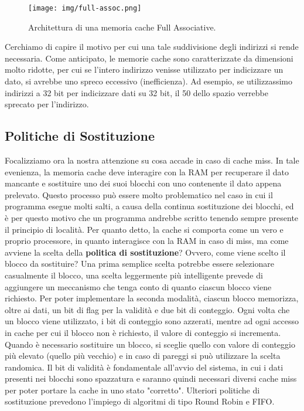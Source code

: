 \begin{figure}[!h]
    \centering
    \texttt{[image: img/full-assoc.png]}
    \caption{Architettura di una memoria cache Full Associative.}
    \label{fig:full-ass}
\end{figure}

Cerchiamo di capire il motivo per cui una tale suddivisione degli indirizzi si rende necessaria. Come anticipato, le memorie cache sono caratterizzate da dimensioni molto ridotte, per cui se l'intero indirizzo venisse utilizzato per indicizzare un dato, si avrebbe uno spreco eccessivo (inefficienza). Ad esempio, se utilizzassimo indirizzi a 32 bit per indicizzare dati su 32 bit, il 50 dello spazio verrebbe sprecato per l'indirizzo.

\subsection{Politiche di Sostituzione}
Focalizziamo ora la nostra attenzione su cosa accade in caso di cache miss. In tale evenienza, la memoria cache deve interagire con la RAM per recuperare il dato mancante e sostituire uno dei suoi blocchi con uno contenente il dato appena prelevato. Questo processo può essere molto problematico nel caso in cui il programma esegue molti salti, a causa della continua sostituzione dei blocchi, ed è per questo motivo che un programma andrebbe scritto tenendo sempre presente il principio di località. Per quanto detto, la cache si comporta come un vero e proprio processore, in quanto interagisce con la RAM in caso di miss, ma come avviene la scelta della \textbf{politica di sostituzione}? Ovvero, come viene scelto il blocco da sostituire? Una prima semplice scelta potrebbe essere selezionare casualmente il blocco, una scelta leggermente più intelligente prevede di aggiungere un meccanismo che tenga conto di quanto ciascun blocco viene richiesto. Per poter implementare la seconda modalità, ciascun blocco memorizza, oltre ai dati, un bit di flag per la validità e due bit di conteggio. Ogni volta che un blocco viene utilizzato, i bit di conteggio sono azzerati, mentre ad ogni accesso in cache per cui il blocco non è richiesto, il valore di conteggio si incrementa. Quando è necessario sostituire un blocco, si sceglie quello con valore di conteggio più elevato (quello più vecchio) e in caso di pareggi si può utilizzare la scelta randomica. Il bit di validità è fondamentale all'avvio del sistema, in cui i dati presenti nei blocchi sono spazzatura e saranno quindi necessari diversi cache miss per poter portare la cache in uno stato "corretto". Ulteriori politiche di sostituzione prevedono l'impiego di algoritmi di tipo Round Robin e FIFO.

